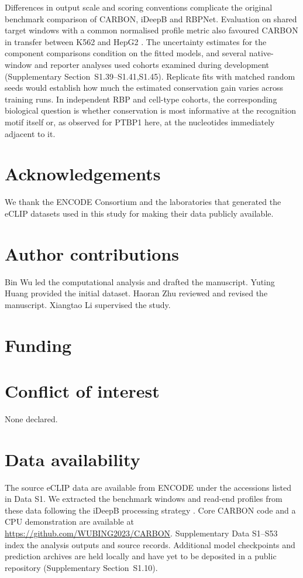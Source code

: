 \documentclass[webpdf,contemporary,large]{current_assets/oup-authoring-template}
\newcommand{\supsect}[1]{Supplementary Section~#1}
\begin{document}
Differences in output scale and scoring conventions complicate the original benchmark comparison of CARBON, iDeepB and RBPNet. Evaluation on shared target windows with a common normalised profile metric also favoured CARBON in transfer between K562 and HepG2 \citep{horlacher2023rbpnet,liu2025ideepb}. The uncertainty estimates for the component comparisons condition on the fitted models, and several native-window and reporter analyses used cohorts examined during development (\supsect{S1.39--S1.41,S1.45}). Replicate fits with matched random seeds would establish how much the estimated conservation gain varies across training runs. In independent RBP and cell-type cohorts, the corresponding biological question is whether conservation is most informative at the recognition motif itself or, as observed for PTBP1 here, at the nucleotides immediately adjacent to it.

\section*{Acknowledgements}
We thank the ENCODE Consortium and the laboratories that generated the eCLIP datasets used in this study for making their data publicly available.

\section*{Author contributions}
Bin Wu led the computational analysis and drafted the manuscript. Yuting Huang provided the initial dataset. Haoran Zhu reviewed and revised the manuscript. Xiangtao Li supervised the study.

\section*{Funding}
\null\par

\section*{Conflict of interest}
None declared.

\section*{Data availability}

The source eCLIP data are available from ENCODE under the accessions listed in Data S1. We extracted the benchmark windows and read-end profiles from these data following the iDeepB processing strategy \citep{liu2025ideepb}. Core CARBON code and a CPU demonstration are available at \url{https://github.com/WUBING2023/CARBON}. Supplementary Data S1--S53 index the analysis outputs and source records. Additional model checkpoints and prediction archives are held locally and have yet to be deposited in a public repository (\supsect{S1.10}).

{\small}
\end{document}
